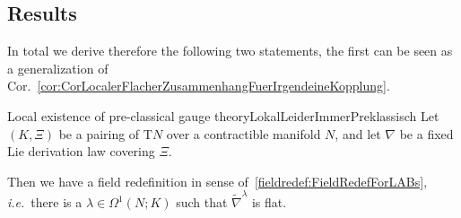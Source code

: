 \documentclass[preprint]{elsarticle}
\theoremstyle{plain}
\theoremstyle{remark}
\theoremstyle{definition}
\begin{document}
\subsection{Results}

In total we derive therefore the following two statements, the first can be seen as a generalization of Cor.~\ref{cor:CorLocalerFlacherZusammenhangFuerIrgendeineKopplung}.

\begin{theorems}{Local existence of pre-classical gauge theory}{LokalLeiderImmerPreklassisch}
Let $(K, \Xi)$ be a pairing of $\mathrm{T}N$ over a contractible manifold $N$, and let $\nabla$ be a fixed Lie derivation law covering $\Xi$.

Then we have a field redefinition in sense of~\ref{fieldredef:FieldRedefForLABs}, \textit{i.e.}~there is a $\lambda\in\Omega^1(N;K)$ such that $\widetilde{\nabla}^\lambda$ is flat.
\end{theorems}
\end{document}
